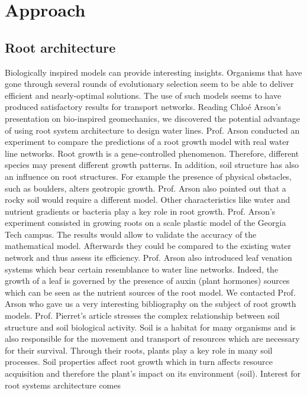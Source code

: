 ﻿\chapter{Approach}
\label{capitolo3}
\thispagestyle{empty}


\section{Root architecture}
\parindent
Biologically inspired models can provide interesting insights. Organisms that have gone
through several rounds of evolutionary selection seem to be able to deliver efficient and
nearly-optimal solutions. The use of such models seems to have produced satisfactory
results for transport networks.
Reading Chlo\'e Arson’s presentation on bio-inspired geomechanics, we discovered the
potential advantage of using root system architecture to design water lines. Prof. Arson
conducted an experiment to compare the predictions of a root growth model with real
water line networks. Root growth is a gene-controlled phenomenon. Therefore, different
species may present different growth patterns. In addition, soil structure has also an influence
on root structures. For example the presence of physical obstacles, such as boulders,
alters geotropic growth. Prof. Arson also pointed out that a rocky soil would require a different model. Other characteristics like water and nutrient gradients or bacteria play
a key role in root growth. Prof. Arson’s experiment consisted in growing roots on a
scale plastic model of the Georgia Tech campus. The results would allow to validate the
accuracy of the mathematical model. Afterwards they could be compared to the existing
water network and thus assess its efficiency. Prof. Arson also introduced leaf venation
systems which bear certain resemblance to water line networks. Indeed, the growth of a
leaf is governed by the presence of auxin (plant hormones) sources which can be seen as
the nutrient sources of the root model.
We contacted Prof. Arson who gave us a very interesting bibliography on the subject
of root growth models. Prof. Pierret’s article stresses the complex relationship between
soil structure and soil biological activity. Soil is a habitat for many organisms and is
also responsible for the movement and transport of resources which are necessary for
their survival. Through their roots, plants play a key role in many soil processes. Soil
properties affect root growth which in turn affects resource acquisition and therefore the
plant’s impact on its environment (soil). Interest for root systems architecture comes
